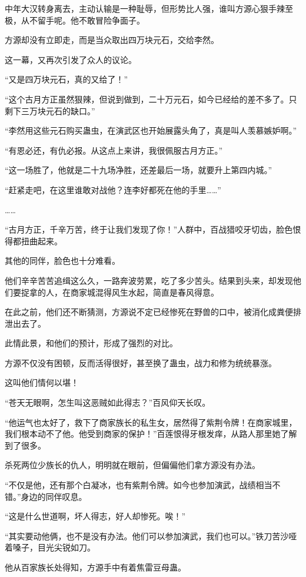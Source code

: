 \begin{this_body}
中年大汉转身离去，主动认输是一种耻辱，但形势比人强，谁叫方源心狠手辣至极，从不留手呢。他不敢冒险争面子。

方源却没有立即走，而是当众取出四万块元石，交给李然。

这一幕，又再次引发了众人的议论。

“又是四万块元石，真的又给了！”

“这个古月方正虽然狠辣，但说到做到，二十万元石，如今已经给的差不多了。只剩下三万块元石的缺口。”

“李然用这些元石购买蛊虫，在演武区也开始展露头角了，真是叫人羡慕嫉妒啊。”

“有恩必还，有仇必报。从这点上来讲，我很佩服古月方正。”

“这一场胜了，他就是二十九场净胜，还差最后一场，就要升上第四内城。”

“赶紧走吧，在这里谁敢对战他？连李好都死在他的手里……”

……

“古月方正，千辛万苦，终于让我们发现了你！”人群中，百战猎咬牙切齿，脸色恨得都扭曲起来。

其他的同伴，脸色也十分难看。

他们辛辛苦苦追缉这么久，一路奔波劳累，吃了多少苦头。结果到头来，却发现他们要捉拿的人，在商家城混得风生水起，简直是春风得意。

在此之前，他们还不断猜测，方源说不定已经惨死在野兽的口中，被消化成粪便排泄出去了。

此情此景，和他们的预计，形成了强烈的对比。

方源不仅没有困顿，反而活得很好，甚至换了蛊虫，战力和修为统统暴涨。

这叫他们情何以堪！

“苍天无眼啊，怎生叫这恶贼如此得志？”百风仰天长叹。

“他运气也太好了，救下了商家族长的私生女，居然得了紫荆令牌！在商家城里，我们根本动不了他。他受到商家的保护！”百莲恨得牙根发痒，从路人那里她了解到了很多。

杀死两位少族长的仇人，明明就在眼前，但偏偏他们拿方源没有办法。

“不仅是他，还有那个白凝冰，也有紫荆令牌。如今也参加演武，战绩相当不错。”身边的同伴叹息。

“这是什么世道啊，坏人得志，好人却惨死。唉！”

“其实要动他俩，也不是没有办法。他们可以参加演武，我们也可以。”铁刀苦沙哑着嗓子，目光尖锐如刀。

他从百家族长处得知，方源手中有着焦雷豆母蛊。


\end{this_body}
